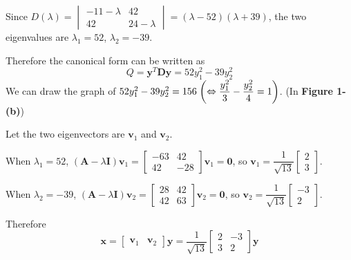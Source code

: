 \documentclass[10pt]{article}
\begin{document}
\begin{enumerate}[leftmargin=*, label={(\alph*)}]
    Since $D(\lambda) = \begin{vmatrix}
        -11 - \lambda & 42 \\ 42 & 24 - \lambda
    \end{vmatrix} = (\lambda-52)(\lambda+39)$, the two eigenvalues are $\lambda_1 = 52$, $\lambda_2 = -39$.

    Therefore the canonical form can be written as
    $$Q = \mathbf{y}^T\mathbf{Dy} = 52y_1^2 - 39y_2^2$$
    We can draw the graph of $52y_1^2 - 39y_2^2 = 156 \; \qty(\Leftrightarrow \dfrac{y_1^2}{3} - \dfrac{y_2^2}{4} = 1)$. (In \textbf{Figure 1-(b)})

    Let the two eigenvectors are $\mathbf{v}_1$ and $\mathbf{v}_2$.

    When $\lambda_1 = 52$, $(\mathbf{A} - \lambda\mathbf{I})\mathbf{v}_1 = \begin{bmatrix}
        -63 & 42 \\ 42 & -28
    \end{bmatrix}\mathbf{v}_1 = \mathbf{0}$, so $\mathbf{v}_1 = \dfrac{1}{\sqrt{13}}\begin{bmatrix} 2 \\ 3 \end{bmatrix}$.

    When $\lambda_2 = -39$, $(\mathbf{A} - \lambda\mathbf{I})\mathbf{v}_2 = \begin{bmatrix}
        28 & 42 \\ 42 & 63
    \end{bmatrix}\mathbf{v}_2 = \mathbf{0}$, so $\mathbf{v}_2 = \dfrac{1}{\sqrt{13}}\begin{bmatrix} -3 \\ 2 \end{bmatrix}$.

    Therefore 
    $$\mathbf{x} = \begin{bmatrix} \mathbf{v}_1 & \mathbf{v}_2 \end{bmatrix}\mathbf{y} = \frac{1}{\sqrt{13}}\begin{bmatrix}
        2 & -3 \\ 3 & 2
    \end{bmatrix}\mathbf{y}$$
\end{enumerate}
\end{document}
